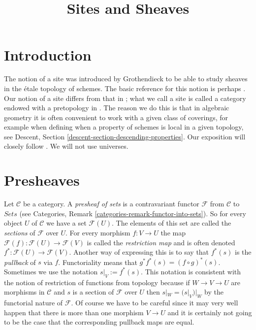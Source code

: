 

%


\title{Sites and Sheaves}


\maketitle

\label{section-phantom}

\tableofcontents

\section{Introduction}
\label{section-introduction}

\noindent
The notion of a site was introduced by Grothendieck to be able to study
sheaves in the \'etale topology of schemes. The basic reference for this
notion is perhaps \cite{SGA4}. Our notion of a site differs from that
in \cite{SGA4}; what we call a site is called a category endowed with
a pretopology in \cite[Expos\'e II, D\'efinition 1.3]{SGA4}.
The reason we do this is that in algebraic geometry it is often convenient to
work with a given class of coverings, for example when defining when
a property of schemes is local in a given topology, see Descent,
Section \ref{descent-section-descending-properties}.
Our exposition will closely follow \cite{ArtinTopologies}.
We will not use universes.












\section{Presheaves}
\label{section-presheaves}

\noindent
Let $\mathcal{C}$ be a category.
A {\it presheaf of sets} is a contravariant functor $\mathcal{F}$
from $\mathcal{C}$ to $\textit{Sets}$ (see Categories, Remark
\ref{categories-remark-functor-into-sets}).
So for every object $U$ of $\mathcal{C}$ we have a set
$\mathcal{F}(U)$. The elements of this set are called
the {\it sections} of $\mathcal{F}$ over $U$. For every morphism
$f : V \to U$ the map $\mathcal{F}(f) : \mathcal{F}(U) \to \mathcal{F}(V)$
is called the {\it restriction map} and is often denoted
$f^\ast : \mathcal{F}(U) \to \mathcal{F}(V)$. Another way
of expressing this is to say that $f^*(s)$ is the {\it pullback}
of $s$ via $f$. Functoriality means that $g^* f^* (s) = (f \circ g)^*(s)$.
Sometimes we use the notation $s|_V := f^\ast(s)$.
This notation is consistent with the notion of restriction
of functions from topology because if $W \to V \to U$
are morphisms in $\mathcal{C}$ and $s$ is a section of
$\mathcal{F}$ over $U$ then $s|_W = (s|_V)|_W$ by the
functorial nature of $\mathcal{F}$. Of course we have to be
careful since it may very well happen
that there is more than one morphism $V \to U$ and it is
certainly not going to be the case that the corresponding
pullback maps are equal.

